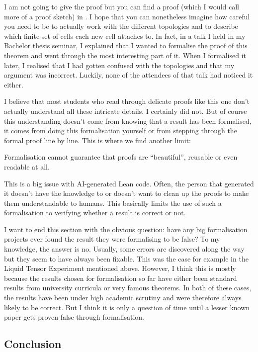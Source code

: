 I am not going to give the proof but you can find a proof (which I would call more of a proof sketch) in \cite{Hatcher}. I hope that you can nonetheless imagine how careful you need to be to actually work with the different topologies and to describe which finite set of cells each new cell attaches to. In fact, in a talk I held in my Bachelor thesis seminar, I explained that I wanted to formalise the proof of this theorem and went through the most interesting part of it. When I formalised it later, I realised that I had gotten confused with the topologies and that my argument was incorrect. Luckily, none of the attendees of that talk had noticed it either.

I believe that most students who read through delicate proofs like this one don't actually understand all these intricate details. I certainly did not. But of course this understanding doesn't come from knowing that a result has been formalised, it comes from doing this formalisation yourself or from stepping through the formal proof line by line. This is where we find another limit: 

\begin{limit}
Formalisation cannot guarantee that proofs are ``beautiful'', reusable or even readable at all. 
\end{limit}

This is a big issue with AI-generated Lean code. Often, the person that generated it doesn't have the knowledge to or doesn't want to clean up the proofs to make them understandable to humans. This basically limits the use of such a formalisation to verifying whether a result is correct or not. 

I want to end this section with the obvious question: have any big formalisation projects ever found the result they were formalising to be false? To my knowledge, the answer is no. Usually, some errors are discovered along the way but they seem to have always been fixable. This was the case for example in the Liquid Tensor Experiment mentioned above. However, I think this is mostly because the results chosen for formalisation so far have either been standard results from university curricula or very famous theorems. In both of these cases, the results have been under high academic scrutiny and were therefore always likely to be correct. But I think it is only a question of time until a lesser known paper gets proven false through formalisation. 

\subsection*{Conclusion}

